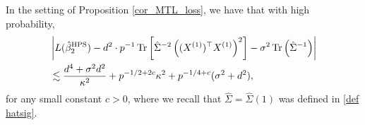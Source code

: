 \begin{claim}
In the setting of Proposition \ref{cor_MTL_loss}, we have that with high probability,
\begin{align}
&\left|L(\hat{\beta}_2^{\textup{HPS}}) - d^2\cdot {p}^{-1}\operatorname{Tr}\left[\hat\Sigma^{-2} \left((X^{(1)})^\top X^{(1)} \right)^2\right] -\sigma^2  \operatorname{Tr}\left({\hat \Sigma^{-1}  }\right)\right| \nonumber\\
&\lesssim  \frac{d^4 + \sigma^2 d^2}{\kappa^2}+p^{-1/2+2c}\kappa^2 +  p^{-1/4+c} (\sigma^2 +d^2) , \label{simple1}
\end{align}
for any small constant $c>0$, where we recall that $\hat \Sigma=\hat \Sigma(1)$ was defined in \eqref{def hatsig}.
\end{claim}
